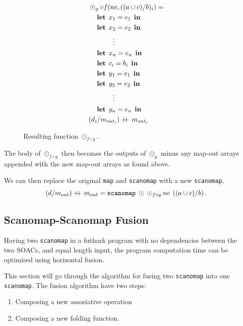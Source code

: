 \documentclass[11pt]{article}
\newcommand\doubleplus{+\kern-1.3ex+\kern0.8ex}
\newcommand\lett{\phantom{-}\:\:\mathbf{let}\:\:}
\newcommand\inn{\:\:\mathbf{in}\:\:}
\begin{document}
\begin{figure}[h!]\centering
  \begin{mdframed}[style=alignbox]
    \begin{align*}
      &\odot_{g} \circ f(ne, ((a \cup c) / b)_i) = \\
      &\lett x_1 = e_1 \inn\\
      &\lett x_2 = e_2 \inn\\
      &\phantom{----}\vdots\\
      &\lett x_n = e_n \inn\\
      &\lett c_i = b_i \inn\\
      &\lett y_1 = e_1 \inn\\
      &\lett y_2 = e_2 \inn\\
      &\phantom{----}\vdots\\
      &\lett y_n = e_n \inn\\
      &(d_i /m_{out_i}) \doubleplus m_{out_i}
    \end{align*}
  \end{mdframed}

  \caption{Resulting function $\odot_{f \circ g}$.}
  \label{fig:fusresfun}
\end{figure}
The body of $\odot_{f\circ g}$ then becomes the outputs of $\odot_g$ minus any map-out arrays appended with the new map-out arrays as
 found above.

We can then replace the original \texttt{map} and \texttt{scanomap} with a new \texttt{scanomap},
$$(d / m_{out}) \doubleplus m_{out} = \mathtt{scanomap} \: \odot \: \odot_{f \circ g} \: ne \: \left((a \cup c) / b \right)\mathnormal{.} $$

\subsection{Scanomap-Scanomap Fusion}
Having two \texttt{scanomap} in a futhark program with no dependencies between the two SOACs, and equal length input, the program computation time can be optimised using horizontal fusion. 

This section will go through the algorithm for fusing two \texttt{scanomap} into one \texttt{scanomap}. The fusion algorithm have two steps:
\begin{enumerate}
\item Composing a new assosiative operation
\item Composing a new folding function.
\end{enumerate}
\end{document}
